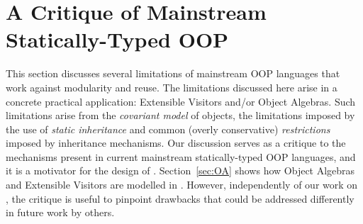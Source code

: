 \section{A Critique of Mainstream Statically-Typed OOP}
\label{sec:critique}

This section discusses several limitations of mainstream OOP languages
that work against modularity and reuse. The limitations discussed here
arise in a concrete practical application: Extensible Visitors and/or
Object Algebras. Such limitations arise from the \emph{covariant
  model} of objects, the limitations imposed by the use of
\emph{static inheritance} and common (overly conservative)
\emph{restrictions} imposed by inheritance mechanisms.  Our discussion
serves as a critique to the mechanisms present in current mainstream
statically-typed OOP languages, and it is a motivator for the design
of \name. Section~\ref{sec:OA} shows how Object Algebras and Extensible
Visitors are modelled in \name.  However, independently of our work on
\name, the critique is useful to pinpoint drawbacks that could be
addressed differently in future work by others.

